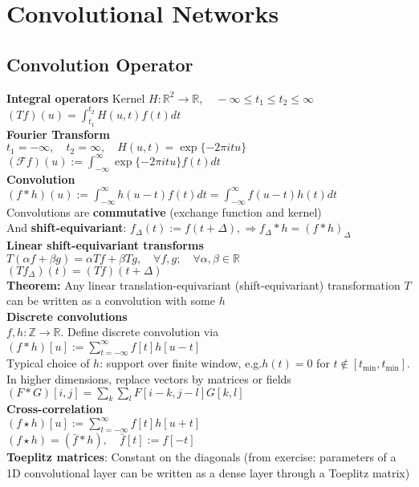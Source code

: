 \section*{Convolutional Networks}
\subsection*{Convolution Operator}
\textbf{Integral operators}
Kernel $H:\mathbb{R}^2\rightarrow\mathbb{R}, \quad -\infty\leq t_1\leq t_2 \leq \infty$\\
$\left(Tf\right)(u)=\int_{t_1}^{t_2}H(u,t)f(t)dt$\\
\textbf{Fourier Transform}\\
$t_1=-\infty,\quad t_2=\infty, \quad H(u,t) = \exp\{-2\pi itu\}$\\
$(\mathcal{F}f)(u):=\int_{-\infty}^{\infty}\exp\{-2\pi itu\}f(t)dt$\\
\textbf{Convolution}\\
$(f*h)(u):=\int_{-\infty}^{\infty}h(u-t)f(t)dt = \int_{-\infty}^{\infty}f(u-t)h(t)dt$\\ Convolutions are \textbf{commutative} (exchange function and kernel)
\\And \textbf{shift-equivariant}: $f_\Delta(t):=f(t+\Delta), \Rightarrow f_\Delta*h=(f*h)_\Delta$\\
\textbf{Linear shift-equivariant transforms}\\
$T(\alpha f+\beta g) = \alpha Tf+\beta Tg, \quad \forall f,g ; \quad \forall\alpha,\beta\in \mathbb{R}$\\
$\left(Tf_{\Delta}\right)(t) = \left(Tf\right)(t+\Delta)$\\
\textbf{Theorem:} Any linear translation-equivariant (shift-equivariant) transformation $T$ can be written as a convolution with some $h$\\
\textbf{Discrete convolutions}\\
$f,h:\mathbb{Z}\rightarrow \mathbb{R}$. Define discrete convolution via\\ $(f*h)[u]:=\sum_{t=-\infty}^{\infty}f[t]h[u-t]$\\Typical choice of $h$: support over finite window, e.g.$h(t)=0$ for $t\notin [t_{\text{min}},t_{\text{min}}]$. In higher dimensions, replace vectors by matrices or fields $(F*G)[i,j] = \sum_k\sum_lF[i-k,j-l]G[k,l]$\\
\textbf{Cross-correlation}\\
 $(f\star h)[u]:=\sum_{t=-\infty}^{\infty}f[t]h[u+t]$\\
 $(f\star h)=(\bar f*h), \quad \bar f[t]:=f[-t]$\\
\textbf{Toeplitz matrices}: Constant on the diagonals (from exercise: parameters of a 1D convolutional layer can be written as a dense layer through a Toeplitz matrix)

